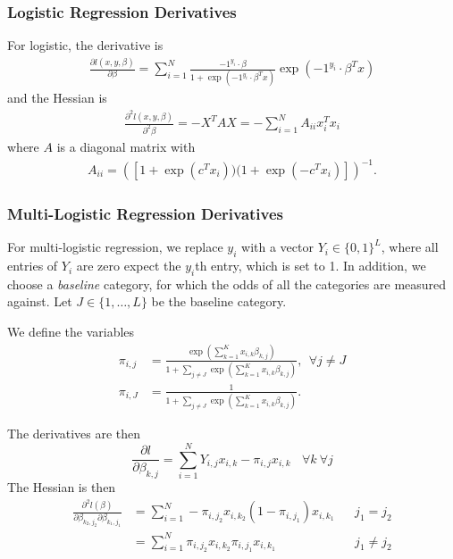 \subsubsection{Logistic Regression Derivatives}
For logistic, the derivative is 
\begin{align}
\frac{\partial l(x,y,\beta)}{\partial \beta} = \sum_{i=1}^N \frac{-1^{y_i}\cdot \beta}{1 + \exp(-1^{y_i} \cdot  \beta^Tx)}  \exp(-1^{y_i}\cdot \beta^Tx)
\end{align}
and the Hessian is
\begin{align}
\frac{\partial^2 l(x,y,\beta)}{\partial^2 \beta} = -X^TAX = -\sum_{i=1}^N A_{ii} x_i^T x_i 
\end{align}
where $A$ is a diagonal matrix with 
\begin{align}
A_{ii} = \left( [1 + \exp(c^Tx_i) ) (1 + \exp(-c^Tx_i)] \right)^{-1}.
\end{align}

\subsubsection{Multi-Logistic Regression Derivatives}

For multi-logistic regression,  we replace $y_i$ with a vector $Y_i \in \{0,1\}^L$, where all entries of $Y_i$ are zero expect the $y_i$th entry, which is set to 1.  In addition, we choose a \textit{baseline} category, for which the odds of all the categories are measured against.  Let $J \in \{1, \dots, L \}$ be the baseline category.  

We define the variables
\begin{align}
\pi_{i,j} &= \frac{\exp\left(\sum_{k=1}^K x_{i,k} \beta_{k,j} \right)}{1 + \sum_{j\ne J} \exp \left(\sum_{k=1}^K x_{i,k} \beta_{k,j} \right)}, \ \ \forall j \ne J\\
\pi_{i,J} &= \frac{1}{1 + \sum_{j\ne J} \exp \left(\sum_{k=1}^K x_{i,k} \beta_{k,j} \right)}.
\end{align}

The derivatives are then
\begin{equation}\label{eq:first_derivative}
\frac{\partial l}{\partial \beta_{k,j}} = \sum_{i=1}^{N} Y_{i,j}x_{i,k} - \pi_{i,j}x_{i,k} \ \ \ \ \forall k \  \forall j
\end{equation}
The Hessian is then 
\begin{align}\label{eq:second_derivative}
\frac{\partial^2 l({\beta})}{\partial \beta_{k_2,j_2} \partial \beta_{k_1,j_1}} 
&= \sum_{i=1}^{N} -\pi_{i,j_2}x_{i,k_2}(1-\pi_{i,j_1})x_{i,k_1} &&j_1 = j_2 \\
&= \sum_{i=1}^{N} \pi_{i,j_2}x_{i,k_2}\pi_{i,j_1}x_{i,k_1} &&j_1 \neq j_2 
\end{align}

